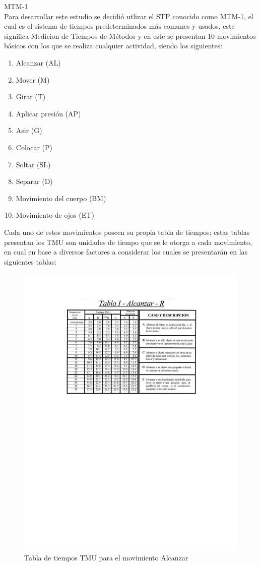     MTM-1\\
    Para desarrollar este estudio se decidió utlizar el STP conocido como MTM-1, el cual es el sistema de tiempos predeterminados más comunes y usados, este significa Medicion de Tiempos de Métodos y en este se presentan 10 movimientos básicos con los que se realiza cualquier actividad, siendo los siguientes:
    \begin{enumerate}
    \item Alcanzar (AL)
    \item Mover (M)
    \item Girar (T)
    \item Aplicar presión (AP)
    \item Asir (G)
    \item Colocar (P)
    \item Soltar (SL)
    \item Separar (D)
    \item Movimiento del cuerpo (BM)
\item Movimiento de ojos (ET)
    \end{enumerate}
    Cada uno de estos movimientos poseen su propia tabla de tiempos; estas tablas presentan los TMU son unidades de tiempo que se le otorga a cada movimiento, en cual en base a diversos factores a considerar los cuales se presentarán en las siguientes tablas:
\begin{figure}[H]
        \centering
        \includegraphics[trim = {42mm 150mm 42mm 24mm},clip,scale=0.6]{19/Img/tablaAlcanzar.pdf}
        \caption{Tabla de tiempos TMU para el movimiento Alcanzar}
        \label{fig:tablaAlcanzar}
    \end{figure}

